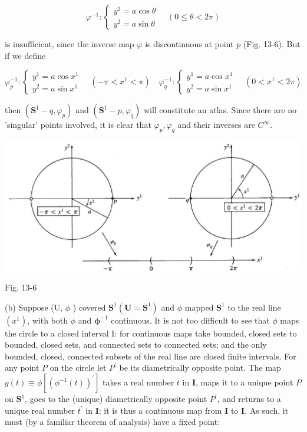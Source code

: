 \documentclass[10pt]{article}
\begin{document}
$$
\varphi^{-1}:\left\{\begin{array}{l}
y^{1}=a \cos \theta \\
y^{2}=a \sin \theta
\end{array} \quad(0 \leq \theta<2 \pi)\right.
$$

is insufficient, since the inverse map $\varphi$ is discontinuous at point $p$ (Fig. 13-6). But if we define

$$
\varphi_{p}^{-1}:\left\{\begin{array}{l}
y^{1}=a \cos x^{1} \\
y^{2}=a \sin x^{1}
\end{array} \quad\left(-\pi<x^{1}<\pi\right) \quad \varphi_{q}^{-1}:\left\{\begin{array}{l}
y^{1}=a \cos x^{1} \\
y^{2}=a \sin x^{1}
\end{array} \quad\left(0<x^{1}<2 \pi\right)\right.\right.
$$

then $\left(\mathbf{S}^{1}-q, \varphi_{p}\right)$ and $\left(\mathbf{S}^{1}-p, \varphi_{q}\right)$ will constitute an atlas. Since there are no 'singular' points involved, it is clear that $\varphi_{p}, \varphi_{q}$ and their inverses are $C^{\infty}$.

\begin{center}
\includegraphics[max width=\textwidth]{2024_04_03_41f90be4f896e21f0dc9g-214}
\end{center}

Fig. 13-6

(b) Suppose (U, $\phi$ ) covered $\mathbf{S}^{1}\left(\mathbf{U}=\mathbf{S}^{1}\right)$ and $\phi$ mapped $\mathbf{S}^{1}$ to the real line $\left(x^{1}\right)$, with both $\phi$ and $\boldsymbol{\phi}^{-1}$ continuous. It is not too difficult to see that $\phi$ maps the circle to a closed interval I: for continuous maps take bounded, closed sets to bounded, closed sets, and connected sets to connected sets; and the only bounded, closed, connected subsets of the real line are closed finite intervals. For any point $P$ on the circle let $P^{\prime}$ be its diametrically opposite point. The map $g(t) \equiv \phi\left[\left(\phi^{-1}(t)\right)^{\prime}\right]$ takes a real number $t$ in $\mathbf{I}$, maps it to a unique point $P$ on $\mathbf{S}^{1}$, goes to the (unique) diametrically opposite point $P^{\prime}$, and returns to a unique real number $t^{\prime}$ in $\mathbf{I}$; it is thus a continuous map from $\mathbf{I}$ to $\mathbf{I}$. As such, it must (by a familiar theorem of analysis) have a fixed point:
\end{document}
